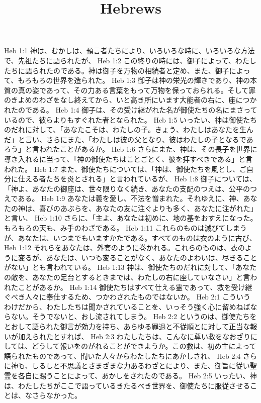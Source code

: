 

\title{Hebrews}

Heb 1:1  神は、むかしは、預言者たちにより、いろいろな時に、いろいろな方法で、先祖たちに語られたが、
Heb 1:2  この終りの時には、御子によって、わたしたちに語られたのである。神は御子を万物の相続者と定め、また、御子によって、もろもろの世界を造られた。
Heb 1:3  御子は神の栄光の輝きであり、神の本質の真の姿であって、その力ある言葉をもって万物を保っておられる。そして罪のきよめのわざをなし終えてから、いと高き所にいます大能者の右に、座につかれたのである。
Heb 1:4  御子は、その受け継がれた名が御使たちの名にまさっているので、彼らよりもすぐれた者となられた。
Heb 1:5  いったい、神は御使たちのだれに対して、「あなたこそは、わたしの子。きょう、わたしはあなたを生んだ」と言い、さらにまた、「わたしは彼の父となり、彼はわたしの子となるであろう」と言われたことがあるか。
Heb 1:6  さらにまた、神は、その長子を世界に導き入れるに当って、「神の御使たちはことごとく、彼を拝すべきである」と言われた。
Heb 1:7  また、御使たちについては、「神は、御使たちを風とし、ご自分に仕える者たちを炎とされる」と言われているが、
Heb 1:8  御子については、「神よ、あなたの御座は、世々限りなく続き、あなたの支配のつえは、公平のつえである。
Heb 1:9  あなたは義を愛し、不法を憎まれた。それゆえに、神、あなたの神は、喜びのあぶらを、あなたの友に注ぐよりも多く、あなたに注がれた」と言い、
Heb 1:10  さらに、「主よ、あなたは初めに、地の基をおすえになった。もろもろの天も、み手のわざである。
Heb 1:11  これらのものは滅びてしまうが、あなたは、いつまでもいますかたである。すべてのものは衣のように古び、
Heb 1:12  それらをあなたは、外套のように巻かれる。これらのものは、衣のように変るが、あなたは、いつも変ることがなく、あなたのよわいは、尽きることがない」とも言われている。
Heb 1:13  神は、御使たちのだれに対して、「あなたの敵を、あなたの足台とするときまでは、わたしの右に座していなさい」と言われたことがあるか。
Heb 1:14  御使たちはすべて仕える霊であって、救を受け継ぐべき人々に奉仕するため、つかわされたものではないか。
Heb 2:1  こういうわけだから、わたしたちは聞かされていることを、いっそう強く心に留めねばならない。そうでないと、おし流されてしまう。
Heb 2:2  というのは、御使たちをとおして語られた御言が効力を持ち、あらゆる罪過と不従順とに対して正当な報いが加えられたとすれば、
Heb 2:3  わたしたちは、こんなに尊い救をなおざりにしては、どうして報いをのがれることができようか。この救は、初め主によって語られたものであって、聞いた人々からわたしたちにあかしされ、
Heb 2:4  さらに神も、しるしと不思議とさまざまな力あるわざとにより、また、御旨に従い聖霊を各自に賜うことによって、あかしをされたのである。
Heb 2:5  いったい、神は、わたしたちがここで語っているきたるべき世界を、御使たちに服従させることは、なさらなかった。
